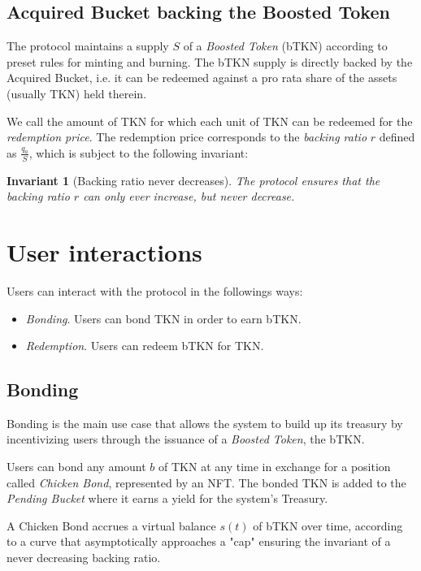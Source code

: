 \documentclass{article}
\newtheorem*{invariant}{Invariant}
\begin{document}
\subsection{Acquired Bucket backing the Boosted Token}
The protocol maintains a supply $S$ of a \textit{Boosted Token} (bTKN) according to preset rules for minting and burning. The bTKN supply is directly backed by the Acquired Bucket, i.e. it can be redeemed against a pro rata share of the assets (usually TKN) held therein.

We call the amount of TKN for which each unit of TKN can be redeemed for the  \textit{redemption price}. The redemption price corresponds to the \textit{backing ratio} $r$ defined as $\frac{q_a}{S}$, which is subject to the following invariant:

\begin{invariant}[Backing ratio never decreases]
The protocol ensures that the backing ratio $r$ can only ever increase, but never decrease.
\end{invariant}

\section{User interactions}

Users can interact with the protocol in the followings ways:
\begin{itemize}
    \item \textit{Bonding}. Users can bond TKN in order to earn bTKN.
    \item \textit{Redemption}. Users can redeem bTKN for TKN.
\end{itemize}

\subsection{Bonding}
Bonding is the main use case that allows the system to build up its treasury by incentivizing users through the issuance of a  \textit{Boosted Token}, the bTKN. 

Users can bond any amount $b$ of TKN at any time in exchange for a position called \textit{Chicken Bond}, represented by an NFT. The bonded TKN is added to the \textit{Pending Bucket} where it earns a yield for the system's Treasury.

A Chicken Bond accrues a virtual balance $s(t)$ of bTKN over time, according to a curve that asymptotically approaches a "cap" ensuring the invariant of a never decreasing backing ratio.
\end{document}
